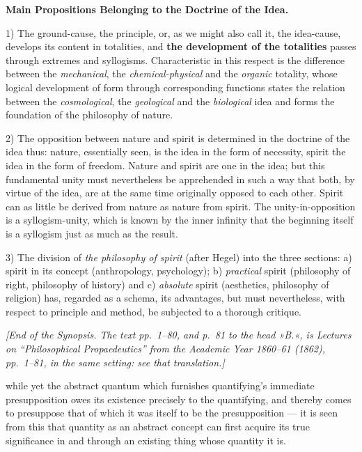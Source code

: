 \documentclass[12pt,a4paper,openany]{book}
\newcommand{\opage}[1]{\marginnote{\footnotesize\textit{[#1]}}}
\newcommand{\editorial}[1]{\par\medskip\begin{center}\small\textit{[#1]}\end{center}\medskip\par}
\begin{document}
\begin{center}\textbf{Main Propositions Belonging to the Doctrine of the Idea.}\end{center}

1) The ground-cause, the principle, or, as we might also call it, the idea-cause, develops its content in totalities,
and \textbf{the development of the totalities} passes through extremes and %
\opage{6}syllogisms. Characteristic in this respect is the difference between the \emph{mechanical}, the
\emph{chemical-physical} and the \emph{organic} totality, whose logical development of form through corresponding
functions states the relation between the \emph{cosmological}, the \emph{geological} and the \emph{biological} idea
and forms the foundation of the philosophy of nature.

2) The opposition between nature and spirit is determined in the doctrine of the idea thus: nature, essentially seen,
is the idea in the form of necessity, spirit the idea in the form of freedom. Nature and spirit are one in the idea;
but this fundamental unity must nevertheless be apprehended in such a way that both, by virtue of the idea, are at the
same time originally opposed to each other. Spirit can as little be derived from nature as nature from spirit. The
unity-in-opposition is a syllogism-unity, which is known by the inner infinity that the beginning itself is a
syllogism just as much as the result.

3) The division of \emph{the philosophy of spirit} (after Hegel) into the three sections: a) spirit in its concept
(anthropology, psychology); b) \emph{practical} spirit (philosophy of right, philosophy of history) and c)
\emph{absolute} spirit (aesthetics, philosophy of religion) has, regarded as a schema, its advantages, but must
nevertheless, with respect to principle and method, be subjected to a thorough critique.

\editorial{End of the Synopsis.  The text pp.~1--80, and p.~81 to the head »B.«, is \emph{Lectures on
``Philosophical Propaedeutics'' from the Academic Year 1860--61} (1862), pp.~1--81, in the same setting: see that
translation.}

\opage{81}while yet the abstract quantum which furnishes quantifying's immediate presupposition owes its existence
precisely to the quantifying, and thereby comes to presuppose that of which it was itself to be the presupposition
--- it is seen from this that quantity as an abstract concept can first acquire its true significance in and through
an existing thing whose quantity it is.
\end{document}

